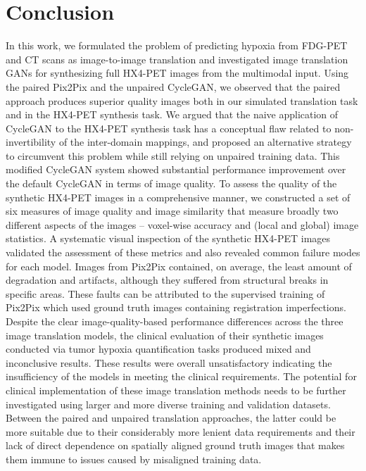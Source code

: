\chapter{Conclusion}
\label{Conclusion}

In this work, we formulated the problem of predicting hypoxia from FDG-PET and CT scans as image-to-image translation and investigated image translation GANs for synthesizing full HX4-PET images from the multimodal input. Using the paired Pix2Pix and the unpaired CycleGAN, we observed that the paired approach produces superior quality images both in our simulated translation task and in the HX4-PET synthesis task. We argued that the naive application of CycleGAN to the HX4-PET synthesis task has a conceptual flaw related to non-invertibility of the inter-domain mappings, and proposed an alternative strategy to circumvent this problem while still relying on unpaired training data. This modified CycleGAN system showed substantial performance improvement over the default CycleGAN in terms of image quality. To assess the quality of the synthetic HX4-PET images in a comprehensive manner, we constructed a set of six measures of image quality and image similarity that measure broadly two different aspects of the images -- voxel-wise accuracy and (local and global) image statistics. A systematic visual inspection of the synthetic HX4-PET images validated the assessment of these metrics and also revealed common failure modes for each model. Images from Pix2Pix contained, on average, the least amount of degradation and artifacts, although they suffered from structural breaks in specific areas. These faults can be attributed to the supervised training of Pix2Pix which used ground truth images containing registration imperfections. Despite the clear image-quality-based performance differences across the three image translation models, the clinical evaluation of their synthetic images conducted via tumor hypoxia quantification tasks produced mixed and inconclusive results. These results were overall unsatisfactory indicating the insufficiency of the models in meeting the clinical requirements. The potential for clinical implementation of these image translation methods needs to be further investigated using larger and more diverse training and validation datasets. Between the paired and unpaired translation approaches, the latter could be more suitable due to their considerably more lenient data requirements and their lack of direct dependence on spatially aligned ground truth images that makes them immune to issues caused by misaligned training data.